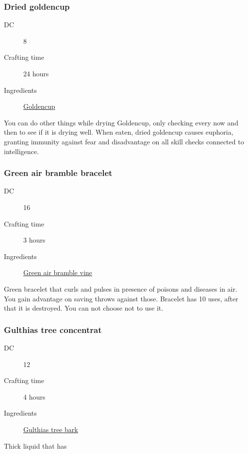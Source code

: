 \subsubsection{Dried goldencup}
\label{Dried goldencup}

\begin{description}
\item [DC] 8
\item [Crafting time] 24 hours
\item [Ingredients] \hyperref[Goldencup]{Goldencup}
\end{description}

You can do other things while drying Goldencup, only checking every now and then to see if it is drying well.
 When eaten, dried goldencup causes euphoria, granting immunity against fear and 
 disadvantage on all skill checks connected to intelligence.

\subsubsection{Green air bramble bracelet}
\label{Green air bramble bracelet}

\begin{description}
\item [DC] 16
\item [Crafting time] 3 hours
\item [Ingredients] \hyperref[Green Air Bramble]{Green air bramble vine}
\end{description}

Green bracelet that curls and pulses in presence of poisons and diseases in air. 
You gain advantage on saving throws against those. 
Bracelet has 10 uses, after that it is destroyed. You can not choose not to use it.

\subsubsection{Gulthias tree concentrat}
\label{Gulthias tree concentrat}

\begin{description}
\item [DC] 12
\item [Crafting time] 4 hours
\item [Ingredients] \hyperref[Gulthias Tree]{Gulthias tree bark}
\end{description}

Thick liquid that has \poison\poison\poison\poison

